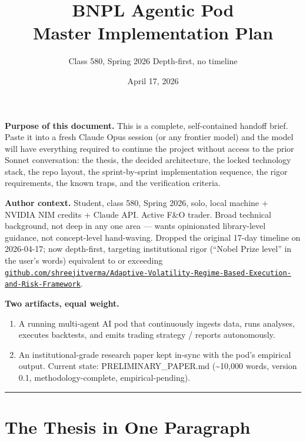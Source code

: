 \documentclass[11pt]{article}
\title{\sffamily\bfseries\Huge BNPL Agentic Pod\\[2pt]\Large Master Implementation Plan}
\author{\sffamily Class 580, Spring 2026 \quad\textbullet\quad Depth-first, no timeline}
\date{\sffamily April 17, 2026}
\newcommand{\inlinecode}[1]{{\ttfamily\small #1}}
\begin{document}
\maketitle

\noindent\textbf{Purpose of this document.} This is a complete, self-contained handoff brief. Paste it into a fresh Claude Opus session (or any frontier model) and the model will have everything required to continue the project without access to the prior Sonnet conversation: the thesis, the decided architecture, the locked technology stack, the repo layout, the sprint-by-sprint implementation sequence, the rigor requirements, the known traps, and the verification criteria.

\noindent\textbf{Author context.} Student, class 580, Spring 2026, solo, local machine + NVIDIA NIM credits + Claude API. Active F\&O trader. Broad technical background, not deep in any one area --- wants opinionated library-level guidance, not concept-level hand-waving. Dropped the original 17-day timeline on 2026-04-17; now depth-first, targeting institutional rigor (``Nobel Prize level'' in the user's words) equivalent to or exceeding \href{https://github.com/shreejitverma/Adaptive-Volatility-Regime-Based-Execution-and-Risk-Framework}{\texttt{github.com/shreejitverma/Adaptive-Volatility-Regime-Based-Execution-and-Risk-Framework}}.

\noindent\textbf{Two artifacts, equal weight.}
\begin{enumerate}
  \item A running multi-agent AI pod that continuously ingests data, runs analyses, executes backtests, and emits trading strategy / reports autonomously.
  \item An institutional-grade research paper kept in-sync with the pod's empirical output. Current state: \inlinecode{PRELIMINARY\_PAPER.md} (\textasciitilde10{,}000 words, version 0.1, methodology-complete, empirical-pending).
\end{enumerate}

\tableofcontents
\vspace{1em}\hrule\vspace{1em}

\section{The Thesis in One Paragraph}
\end{document}
